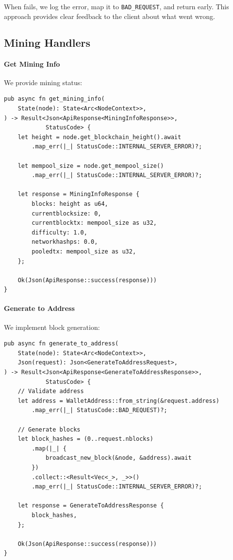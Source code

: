 When  fails, we log the error, map it to \texttt{BAD\_REQUEST}, and return early. This approach provides clear feedback to the client about what went wrong.

\subsection{Mining Handlers}

\paragraph{Get Mining Info}

We provide mining status:

\begin{listing}[htbp]
\caption{Get mining info handler}
\label{lst:handler-mining-info}
\begin{verbatim}
pub async fn get_mining_info(
    State(node): State<Arc<NodeContext>>,
) -> Result<Json<ApiResponse<MiningInfoResponse>>,
            StatusCode> {
    let height = node.get_blockchain_height().await
        .map_err(|_| StatusCode::INTERNAL_SERVER_ERROR)?;

    let mempool_size = node.get_mempool_size()
        .map_err(|_| StatusCode::INTERNAL_SERVER_ERROR)?;

    let response = MiningInfoResponse {
        blocks: height as u64,
        currentblocksize: 0,
        currentblocktx: mempool_size as u32,
        difficulty: 1.0,
        networkhashps: 0.0,
        pooledtx: mempool_size as u32,
    };

    Ok(Json(ApiResponse::success(response)))
}
\end{verbatim}
\end{listing}

\paragraph{Generate to Address}

We implement block generation:

\begin{listing}[htbp]
\caption{Generate to address handler}
\label{lst:handler-generate}
\begin{verbatim}
pub async fn generate_to_address(
    State(node): State<Arc<NodeContext>>,
    Json(request): Json<GenerateToAddressRequest>,
) -> Result<Json<ApiResponse<GenerateToAddressResponse>>,
            StatusCode> {
    // Validate address
    let address = WalletAddress::from_string(&request.address)
        .map_err(|_| StatusCode::BAD_REQUEST)?;

    // Generate blocks
    let block_hashes = (0..request.nblocks)
        .map(|_| {
            broadcast_new_block(&node, &address).await
        })
        .collect::<Result<Vec<_>, _>>()
        .map_err(|_| StatusCode::INTERNAL_SERVER_ERROR)?;

    let response = GenerateToAddressResponse {
        block_hashes,
    };

    Ok(Json(ApiResponse::success(response)))
}
\end{verbatim}
\end{listing}


